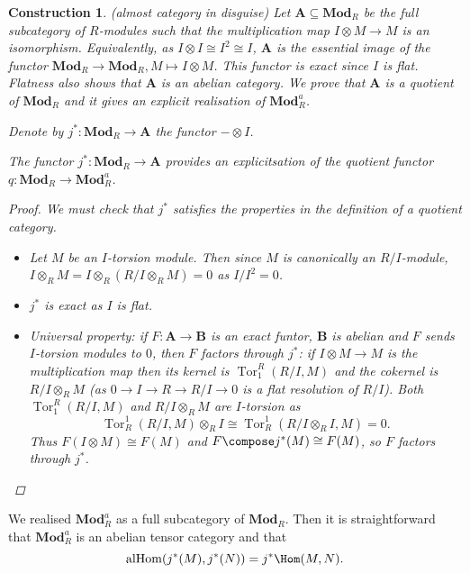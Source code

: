 \documentclass[a4paper]{article}
\renewcommand{\c}[1]{\mathbf{#1}}
\newcommand{\Mod}{{\c{Mod}}}
\DeclareMathOperator{\Tor}{Tor} %
\newtheorem*{construction}{Construction}
\begin{document}
\begin{construction}(almost category in disguise)
  Let \(\c A \subseteq \Mod_R\) be the full subcategory of \(R\)-modules such that the multiplication map \(I \otimes M \to M\) is an isomorphism. Equivalently, as \(I \otimes I \cong I^2 \cong I\), \(\c A\) is the essential image of the functor \(\Mod_R \to \Mod_R, M \mapsto I \otimes M\). This functor is exact since \(I\) is flat. Flatness also shows that \(\c A\) is an abelian category. We prove that \(\c A\) is a quotient of \(\Mod_R\) and it gives an explicit realisation of \(\Mod_R^a\).

  Denote by \(j^*: \Mod_R \to \c A\) the functor \(- \otimes I\).

  \begin{proposition}
    The functor \(j^*: \Mod_R \to \c A\) provides an explicitsation of the quotient functor \(q: \Mod_R \to \Mod_R^a\).
  \end{proposition}

  \begin{proof}
    We must check that \(j^*\) satisfies the properties in the definition of a quotient category.
    \begin{itemize}
    \item Let \(M\) be an \(I\)-torsion module. Then since \(M\) is canonically an \(R/I\)-module, \(I \otimes_R M = I \otimes_R (R/I \otimes_R M) = 0\) as \(I/I^2 = 0\).
    \item \(j^*\) is exact as \(I\) is flat.
    \item Universal property: if \(F: \c A \to \c B\) is an exact funtor, \(\c B\) is abelian and \(F\) sends \(I\)-torsion modules to \(0\), then \(F\) factors through \(j^*\): if \(I \otimes M \to M\) is the multiplication map then its kernel is \(\Tor_1^R(R/I, M)\) and the cokernel is \(R/I \otimes_R M\) (as \(0 \to I \to R \to R/I \to 0\) is a flat resolution of \(R/I\)). Both \(\Tor^R_1(R/I, M)\) and \(R/I \otimes_R M\) are \(I\)-torsion as
      \[
        \Tor_R^1(R/I, M) \otimes_R I \cong \Tor_R^1(R/I \otimes_R I, M) = 0.
      \]
      Thus \(F(I \otimes M) \cong F(M)\) and \(F \compose j^*(M) \cong F(M)\), so \(F\) factors through \(j^*\).
    \end{itemize}
  \end{proof}
\end{construction}

\begin{remark}
  We realised \(\Mod_R^a\) as a full subcategory of \(\Mod_R\). Then it is straightforward that \(\Mod_R^a\) is an abelian tensor category and that
  \[
    \mathrm{alHom}(j^*(M), j^*(N)) = j^* \Hom(M, N).
  \]
\end{remark}
\end{document}

